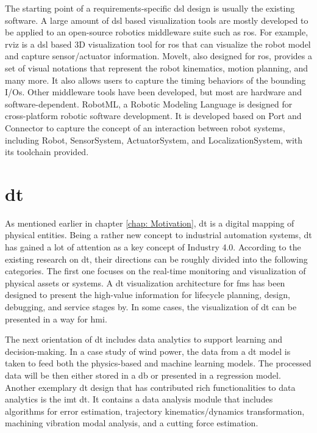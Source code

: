 The starting point of a requirements-specific \gls{dsl} design is usually 
the existing software. 
A large amount of \gls{dsl} based visualization tools are mostly developed 
to be applied to an open-source robotics middleware suite such as \gls{ros}. 
For example, \gls{rviz} is a \gls{dsl} based 3D 
visualization tool for \gls{ros} that can visualize the robot model and 
capture sensor/actuator information. Movelt, also designed for \gls{ros}, 
provides a set of visual notations that represent the robot kinematics, 
motion planning, and many more. It also allows users to capture the 
timing behaviors of the bounding I/Os. Other middleware tools have been 
developed, but most are hardware and software-dependent. RobotML, a 
Robotic Modeling Language is designed for cross-platform robotic 
software development\cite{hutchison_robotml_2012}. It is developed 
based on Port and Connector to
capture the concept of an interaction between robot systems, including 
Robot, SensorSystem, ActuatorSystem, and LocalizationSystem, with its toolchain 
provided\cite[fig.5]{hutchison_robotml_2012}.



\section{\gls{dt}}


As mentioned earlier in chapter \ref{chap: Motivation}, 
\gls{dt} is a digital mapping of physical entities. Being a rather new concept to 
industrial automation systems, \gls{dt} has gained a lot of attention as a key concept 
of Industry 4.0. According to the existing research on \gls{dt}, their 
directions can be roughly divided into the following categories. The first one 
focuses on the real-time monitoring and visualization of physical assets or systems. 
A \gls{dt} visualization architecture for \gls{fms} has been designed to present 
the high-value information for lifecycle planning, design, debugging, and service 
stages by\cite{fan_digital-twin_2021}. In some cases, the visualization of \gls{dt} 
can be presented in a way for \gls{hmi}\cite{schroeder_visualising_2016}. 


The next orientation of \gls{dt} includes data analytics to support 
learning and decision-making. In a case study of wind power, the data from 
a \gls{dt} model is taken to feed both the physics-based and 
machine learning models\cite{erikstad_merging_nodate}. The processed 
data will be then either stored in a \gls{db} or presented in a regression model. 
Another exemplary \gls{dt} design that has contributed rich functionalities to 
data analytics is the \gls{imt} \gls{dt}\cite{tong_real-time_2020}. 
It contains a data analysis module 
that includes algorithms for error estimation, trajectory kinematics/dynamics 
transformation, machining vibration modal analysis, and a cutting force
estimation.

